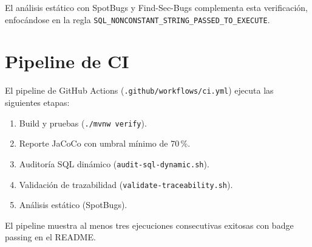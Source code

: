 El análisis estático con SpotBugs y Find-Sec-Bugs complementa esta verificación, enfocándose en la regla \texttt{SQL\_NONCONSTANT\_STRING\_PASSED\_TO\_EXECUTE}.

\section{Pipeline de CI}
\label{sec:ci}

El pipeline de GitHub Actions (\texttt{.github/workflows/ci.yml}) ejecuta las siguientes etapas:

\begin{enumerate}
  \item Build y pruebas (\texttt{./mvnw verify}).
  \item Reporte JaCoCo con umbral mínimo de 70\,\%.
  \item Auditoría SQL dinámico (\texttt{audit-sql-dynamic.sh}).
  \item Validación de trazabilidad (\texttt{validate-traceability.sh}).
  \item Análisis estático (SpotBugs).
\end{enumerate}

El pipeline muestra al menos tres ejecuciones consecutivas exitosas con badge passing en el README.

